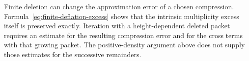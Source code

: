 Finite deletion can change the approximation error of a chosen
compression. Formula~\eqref{eq:finite-deflation-excess} shows that
the intrinsic multiplicity excess itself is preserved exactly.
Iteration with a height-dependent deleted packet requires an
estimate for the resulting compression error and for the cross
terms with that growing packet. The positive-density argument
above does not supply those estimates for the successive remainders.
